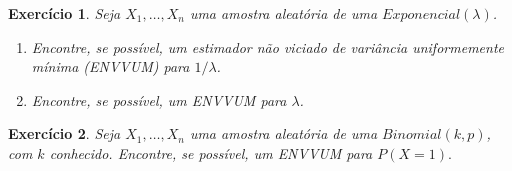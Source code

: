 \documentclass[letter,11pt]{article}
\newtheorem{exer}{Exercício}
\begin{document}
% 
% 
% 
% 



\begin{exer} \rm
Seja $X_1, \ldots, X_n$ uma amostra aleatória de uma $Exponencial(\lambda)$.
\begin{enumerate}[\bf(a)]
\item Encontre, se possível, um estimador não viciado de variância uniformemente mínima (ENVVUM) para $1/\lambda$.
\item Encontre, se possível, um ENVVUM para  $\lambda$.
\end{enumerate}
\end{exer}


\begin{exer} \rm
Seja $X_1, \ldots, X_n$ uma amostra aleatória de uma $Binomial(k,p)$, com $k$ conhecido.
Encontre, se possível, um ENVVUM para $P(X=1).$
\end{exer}
\end{document}
